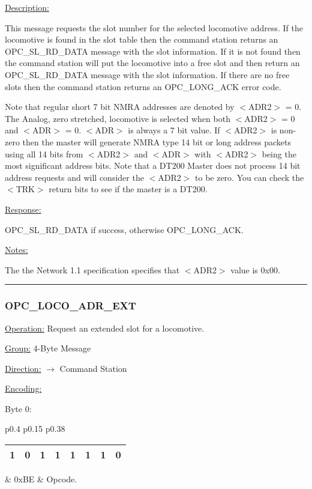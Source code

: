 \underline{Description:}

This message requests the slot number for the selected locomotive address. If the locomotive is found in the slot table then the command station returns an OPC\_SL\_RD\_DATA message with the slot information. If it is not found then the command station will put the locomotive into a free slot and then return an OPC\_SL\_RD\_DATA message with the slot information. If there are no free slots then the command station returns an OPC\_LONG\_ACK error code.

Note that regular short 7 bit NMRA addresses are denoted by $<$ADR2$>$ = 0. The Analog, zero stretched, locomotive is selected when both $<$ADR2$>$ = 0 and $<$ADR$>$ = 0. $<$ADR$>$ is always a 7 bit value. If $<$ADR2$>$ is non-zero then the master will generate NMRA type 14 bit or long address packets using all 14 bits from $<$ADR2$>$ and $<$ADR$>$ with $<$ADR2$>$ being the most significant address bits. Note that a DT200 Master does not process 14 bit address requests and will consider the $<$ADR2$>$ to be zero. You can check the $<$TRK$>$ return bits to see if the master is a DT200.

\underline{Response:} 

OPC\_SL\_RD\_DATA if success, otherwise OPC\_LONG\_ACK.

\underline{Notes:} 

The the Network 1.1 specification specifies that $<$ADR2$>$ value is 0x00.

\rule{15.1cm}{0.4pt}
\subsubsection{OPC\_LOCO\_ADR\_EXT}
\underline{Operation:} Request an extended slot for a locomotive.

\underline{Group:} \hspace{0.5cm} 4-Byte Message

\underline{Direction:} \hspace{0.05cm} $\rightarrow$ Command Station

\underline{Encoding:} 

Byte 0:

\begin{tabular}{p{0.4\linewidth} p{0.15\linewidth} p{0.38\linewidth}} 

\begin{tabular}{|p{0.3cm}|p{0.3cm}|p{0.3cm}|p{0.3cm}|p{0.3cm}|p{0.3cm}|p{0.3cm}|p{0.3cm}|}
\hline
1 & 0 & 1 & 1 & 1 & 1 & 1 & 0\\
\hline
\end{tabular}
& 0xBE & Opcode.\\
\end{tabular}

